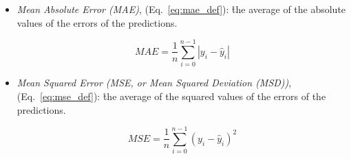 \begin{itemize}
\item \textit{Mean Absolute Error (MAE)}, (Eq.~\ref{eq:mae_def}): \r{the average of the absolute values of the errors of the predictions}.
	
\begin{equation}
{MAE = \frac{1}{n}\sum_{i=0}^{n-1}|y_i - \hat{y}_i| }
\label{eq:mae_def}
\end{equation}
	
\item \textit{Mean Squared Error (MSE, or Mean Squared Deviation (MSD))}, (Eq.~\ref{eq:mse_def}): \r{the average of the squared values of the errors of the predictions}.
	
\begin{equation}
{MSE = \frac{1}{n}\sum_{i=0}^{n-1}(y_i - \hat{y}_i)^2}
\label{eq:mse_def}
\end{equation}
	
\end{itemize}